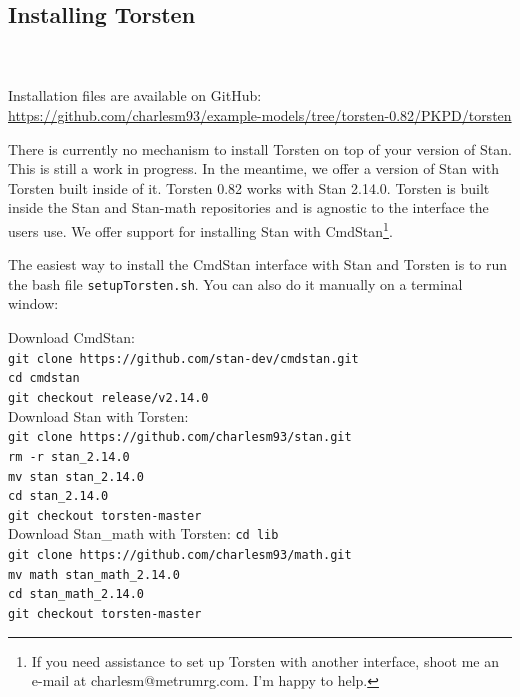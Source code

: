 \documentclass[11pt]{amsart}
\begin{document}
\subsection{Installing Torsten}  \ \\ \ \\  
Installation files are available on GitHub: \url{https://github.com/charlesm93/example-models/tree/torsten-0.82/PKPD/torsten}

There is currently no mechanism to install Torsten on top of your version of Stan. This is still a work in progress. In the meantime, we offer a version of Stan with Torsten built inside of it. Torsten 0.82 works with Stan 2.14.0. Torsten is built inside the Stan and Stan-math repositories and is agnostic to the interface the users use. We offer support for installing Stan with CmdStan\footnote{If you need assistance to set up Torsten with another interface, shoot me an e-mail at charlesm@metrumrg.com. I'm happy to help.}.

The easiest way to install the CmdStan interface with Stan and Torsten is to run the bash file \texttt{setupTorsten.sh}. You can also do it manually on a terminal window:

Download CmdStan: \\
\texttt{git clone https://github.com/stan-dev/cmdstan.git \\
cd cmdstan \\
git checkout release/v2.14.0
} \\

Download Stan with Torsten: \\
\texttt{git clone https://github.com/charlesm93/stan.git \\
rm -r stan\_2.14.0 \\
mv stan stan\_2.14.0 \\
cd stan\_2.14.0 \\
git checkout torsten-master
} \\

Download Stan\_math with Torsten:
\texttt{cd lib \\
git clone https://github.com/charlesm93/math.git \\
mv math stan\_math\_2.14.0 \\
cd stan\_math\_2.14.0 \\
git checkout torsten-master
}
\end{document}
